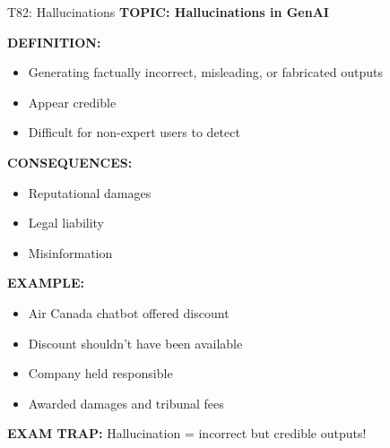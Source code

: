 \documentclass[8pt]{beamer}
\begin{document}
	\begin{frame}{T82: Hallucinations}
		\fontsize{6.5}{7.5}\selectfont
		\textbf{TOPIC: Hallucinations in GenAI}
		
		\vspace{0.1cm}
		\textbf{DEFINITION:}
		\begin{itemize}
			\item Generating factually incorrect, misleading, or fabricated outputs
			\item Appear credible
			\item Difficult for non-expert users to detect
		\end{itemize}
		
		\vspace{0.1cm}
		\textbf{CONSEQUENCES:}
		\begin{itemize}
			\item Reputational damages
			\item Legal liability
			\item Misinformation
		\end{itemize}
		
		\vspace{0.1cm}
		\textbf{EXAMPLE:}
		\begin{itemize}
			\item Air Canada chatbot offered discount
			\item Discount shouldn't have been available
			\item Company held responsible
			\item Awarded damages and tribunal fees
		\end{itemize}
		
		\textcolor{myred}{\textbf{EXAM TRAP:}} Hallucination = \textcolor{myblue}{incorrect but credible outputs}!
	\end{frame}
	
\end{document}

